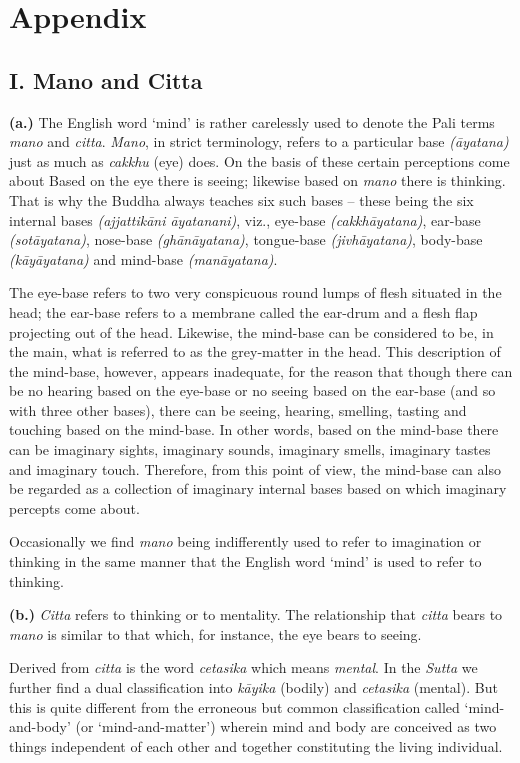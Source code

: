 \chapter{Appendix}

\section{I. Mano and Citta}

\textbf{(a.)} The English word `mind' is rather carelessly used to denote the Pali terms \emph{mano} and \emph{citta}. \emph{Mano}, in strict terminology, refers to a particular base \emph{(āyatana)} just as much as \emph{cakkhu} (eye) does. On the basis of these certain perceptions come about Based on the eye there is seeing; likewise based on \emph{mano} there is thinking. That is why the Buddha always teaches six such bases -- these being the six internal bases \emph{(ajjattikāni āyatanani)}, viz., eye-base \emph{(cakkhāyatana)}, ear-base \emph{(sotāyatana)}, nose-base \emph{(ghānāyatana)}, tongue-base \emph{(jivhāyatana)}, body-base \emph{(kāyāyatana)} and mind-base \emph{(manāyatana)}.

The eye-base refers to two very conspicuous round lumps of flesh situated in the head; the ear-base refers to a membrane called the ear-drum and a flesh flap projecting out of the head. Likewise, the mind-base can be considered to be, in the main, what is referred to as the grey-matter in the head. This description of the mind-base, however, appears inadequate, for the reason that though there can be no hearing based on the eye-base or no seeing based on the ear-base (and so with three other bases), there can be seeing, hearing, smelling, tasting and touching based on the mind-base. In other words, based on the mind-base there can be imaginary sights, imaginary sounds, imaginary smells, imaginary tastes and imaginary touch. Therefore, from this point of view, the mind-base can also be regarded as a collection of imaginary internal bases based on which imaginary percepts come about.

Occasionally we find \emph{mano} being indifferently used to refer to imagination or thinking in the same manner that the English word `mind' is used to refer to thinking.

\textbf{(b.)} \emph{Citta} refers to thinking or to mentality. The relationship that \emph{citta} bears to \emph{mano} is similar to that which, for instance, the eye bears to seeing.

Derived from \emph{citta} is the word \emph{cetasika} which means \emph{mental}. In the \emph{Sutta} we further find a dual classification into \emph{kāyika} (bodily) and \emph{cetasika} (mental). But this is quite different from the erroneous but common classification called `mind-and-body' (or `mind-and-matter') wherein mind and body are conceived as two things independent of each other and together constituting the living individual.

